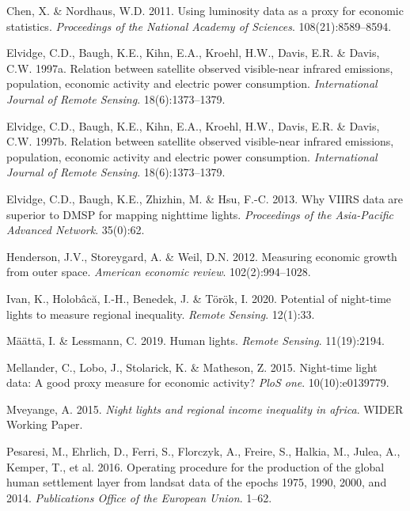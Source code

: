 \documentclass[11pt,preprint, authoryear]{elsarticle}
\numberwithin{equation}{section}
\numberwithin{figure}{section}
\numberwithin{table}{section}
\newlength{\cslhangindent}
\newenvironment{CSLReferences}%
  {\setlength{\parindent}{0pt}%
  \everypar{\setlength{\hangindent}{\cslhangindent}}\ignorespaces}%
  {\par}
\begin{document}
\hypertarget{refs}{}
\begin{CSLReferences}{1}{0}
\leavevmode{}%
Chen, X. \& Nordhaus, W.D. 2011. Using luminosity data as a proxy for
economic statistics. \emph{Proceedings of the National Academy of
Sciences}. 108(21):8589--8594.

\leavevmode{}%
Elvidge, C.D., Baugh, K.E., Kihn, E.A., Kroehl, H.W., Davis, E.R. \&
Davis, C.W. 1997a. Relation between satellite observed visible-near
infrared emissions, population, economic activity and electric power
consumption. \emph{International Journal of Remote Sensing}.
18(6):1373--1379.

\leavevmode{}%
Elvidge, C.D., Baugh, K.E., Kihn, E.A., Kroehl, H.W., Davis, E.R. \&
Davis, C.W. 1997b. Relation between satellite observed visible-near
infrared emissions, population, economic activity and electric power
consumption. \emph{International Journal of Remote Sensing}.
18(6):1373--1379.

\leavevmode{}%
Elvidge, C.D., Baugh, K.E., Zhizhin, M. \& Hsu, F.-C. 2013. Why VIIRS
data are superior to DMSP for mapping nighttime lights.
\emph{Proceedings of the Asia-Pacific Advanced Network}. 35(0):62.

\leavevmode{}%
Henderson, J.V., Storeygard, A. \& Weil, D.N. 2012. Measuring economic
growth from outer space. \emph{American economic review}.
102(2):994--1028.

\leavevmode{}%
Ivan, K., Holobâcă, I.-H., Benedek, J. \& Török, I. 2020. Potential of
night-time lights to measure regional inequality. \emph{Remote Sensing}.
12(1):33.

\leavevmode{}%
Määttä, I. \& Lessmann, C. 2019. Human lights. \emph{Remote Sensing}.
11(19):2194.

\leavevmode{}%
Mellander, C., Lobo, J., Stolarick, K. \& Matheson, Z. 2015. Night-time
light data: A good proxy measure for economic activity? \emph{PloS one}.
10(10):e0139779.

\leavevmode{}%
Mveyange, A. 2015. \emph{Night lights and regional income inequality in
africa}. WIDER Working Paper.

\leavevmode{}%
Pesaresi, M., Ehrlich, D., Ferri, S., Florczyk, A., Freire, S., Halkia,
M., Julea, A., Kemper, T., et al. 2016. Operating procedure for the
production of the global human settlement layer from landsat data of the
epochs 1975, 1990, 2000, and 2014. \emph{Publications Office of the
European Union}. 1--62.

\end{CSLReferences}
\end{document}

